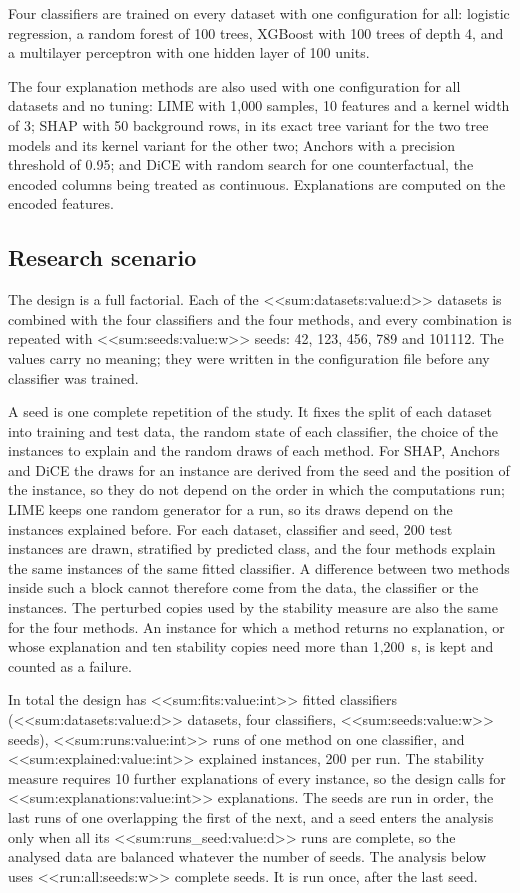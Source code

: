 \documentclass[10pt,a4paper,twocolumn]{article}
\begin{document}
Four classifiers are trained on every dataset with one configuration for all: logistic
regression, a random forest of 100 trees,
XGBoost with 100 trees of depth 4, and a multilayer perceptron
with one hidden layer of 100 units.

The four explanation methods are also used with one configuration for all datasets and
no tuning: LIME with 1,000 samples, 10 features and a kernel width of 3; SHAP with 50
background rows, in its exact tree variant for the two tree models and its kernel variant
for the other two; Anchors with a precision threshold of 0.95; and DiCE with random
search for one counterfactual, the encoded columns being treated as continuous.
Explanations are computed on the encoded features.

\subsection{Research scenario}

The design is a full factorial. Each of the <<sum:datasets:value:d>> datasets is combined
with the four classifiers and the four methods, and every combination is repeated with
<<sum:seeds:value:w>> seeds: 42, 123, 456, 789 and 101112. The values carry no meaning;
they were written in the configuration file before any classifier was trained.

A seed is one complete repetition of the study. It fixes the split of each dataset into
training and test data, the random state of each classifier, the choice of the instances
to explain and the random draws of each method. For SHAP, Anchors and DiCE the draws for
an instance are derived from the seed and the position of the instance, so they do not
depend on the order in which the computations run; LIME keeps one random generator for a
run, so its draws depend on the instances explained before. For each dataset, classifier
and seed, 200 test instances are
drawn, stratified by predicted class, and the four methods explain the same instances of
the same fitted classifier. A difference between two methods inside such a block cannot
therefore come from the data, the classifier or the instances. The perturbed copies used
by the stability measure are also the same for the four methods. An instance for which a
method returns no explanation, or whose explanation and ten stability copies need more
than 1,200~s, is kept and counted as a failure.

In total the design has <<sum:fits:value:int>> fitted classifiers
(<<sum:datasets:value:d>> datasets, four classifiers, <<sum:seeds:value:w>> seeds),
<<sum:runs:value:int>> runs of one method on one classifier, and
<<sum:explained:value:int>> explained instances, 200 per run. The stability measure
requires 10 further explanations of every instance, so the design calls for
<<sum:explanations:value:int>> explanations. The seeds are run in order, the last runs of
one overlapping the first of the next, and a seed enters the analysis only when all its <<sum:runs_seed:value:d>> runs are complete, so
the analysed data are balanced whatever the number of seeds. The analysis below uses
<<run:all:seeds:w>> complete seeds. It is run once, after the last seed.
\end{document}
